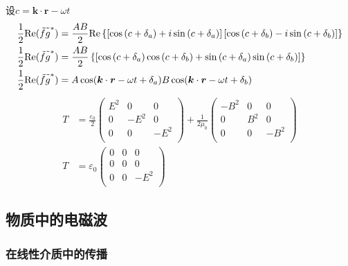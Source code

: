 设$c=\boldsymbol k\cdot\boldsymbol r-\omega t$
\begin{align*}
    \dfrac{1}{2}\mathrm{Re}(\tilde{f}\tilde{g\vphantom{f}}^*)&=\dfrac{AB}{2}\mathrm{Re}\left\{\left[\cos\left({c +\delta_a}\right)+i\sin\left({c +\delta_a}\right)\right]\left[\cos\left({c +\delta_b}\right)-i\sin\left({c +\delta_b}\right)\right]\right\}\\
    \dfrac{1}{2}\mathrm{Re}(\tilde{f}\tilde{g\vphantom{f}}^*)&=\dfrac{AB}{2}\left\{\left[\cos\left({c +\delta_a}\right)\cos\left({c +\delta_b}\right)+\sin\left({c +\delta_a}\right)\sin\left({c +\delta_b}\right)\right]\right\}\\
    \dfrac{1}{2}\mathrm{Re}(\tilde{f}\tilde{g\vphantom{f}}^*)&=A\cos(\boldsymbol k\cdot\boldsymbol r-\omega t +\delta_a)B\cos(\boldsymbol k\cdot\boldsymbol r-\omega t +\delta_b)
\end{align*}
\begin{align*}
    T&=\frac{\varepsilon_0}{2}\left(\begin{matrix}
        E^2&0&0\\
        0&-E^2&0\\
        0&0&-E^2\\
    \end{matrix}\right)
    +\frac{1}{2\mu_0}\left(\begin{matrix}
        -B^2&0&0\\
        0&B^2&0\\
        0&0&-B^2\\
    \end{matrix}\right)\\
    T&=\varepsilon_0\left(\begin{matrix}
        0&0&0\\
        0&0&0\\
        0&0&-E^2\\
    \end{matrix}\right)
\end{align*}
\subsection{物质中的电磁波}
\subsubsection{在线性介质中的传播}

